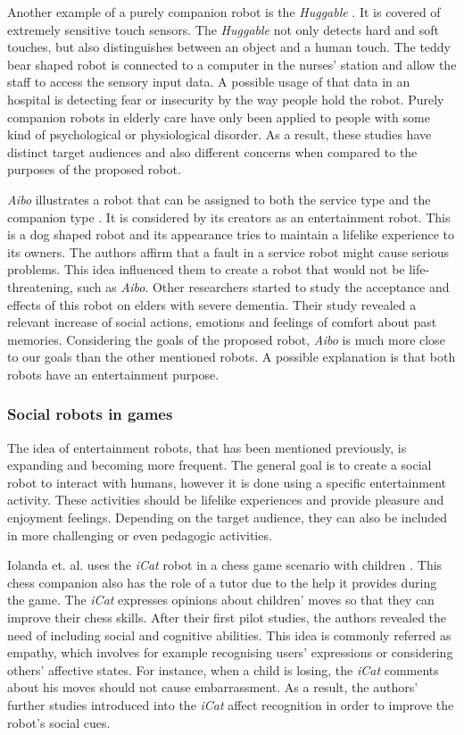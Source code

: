 Another example of a purely companion robot is the \emph{Huggable} \cite{Stiehl2005}.
It is covered of extremely sensitive touch sensors.
The \emph{Huggable} not only detects hard and soft touches, but also distinguishes between an object and a human touch.
The teddy bear shaped robot is connected to a computer in the nurses' station and allow the staff to access the sensory input data.
A possible usage of that data in an hospital is detecting fear or insecurity by the way people hold the robot.
Purely companion robots in elderly care have only been applied to people with some kind of psychological or physiological disorder.
As a result, these studies have distinct target audiences and also different concerns when compared to the purposes of the proposed robot.


\emph{Aibo} illustrates a robot that can be assigned to both the service type and the companion type \cite{Fujita1983}.
It is considered by its creators as an entertainment robot.
This is a dog shaped robot and its appearance tries to maintain a lifelike experience to its owners.
The authors affirm that a fault in a service robot might cause serious problems.
This idea influenced them to create a robot that would not be life-threatening, such as \emph{Aibo}.
Other researchers started to study the acceptance and effects of this robot on elders with severe dementia.
Their study revealed a relevant increase of social actions, emotions and feelings of comfort about past memories.
Considering the goals of the proposed robot, \emph{Aibo} is much more close to our goals than the other mentioned robots.
A possible explanation is that both robots have an entertainment purpose.



\subsubsection{Social robots in games}

The idea of entertainment robots, that has been mentioned previously, is expanding and becoming more frequent.
The general goal is to create a social robot to interact with humans, however it is done using a specific entertainment activity.
These activities should be lifelike experiences and provide pleasure and enjoyment feelings.
Depending on the target audience, they can also be included in more challenging or even pedagogic activities.

Iolanda et. al. uses the \emph{iCat} robot in a chess game scenario with children \cite{Leitea}\cite{Castellano2010}\cite{Leite}.
This chess companion also has the role of a tutor due to the help it provides during the game.
The \emph{iCat} expresses opinions about children' moves so that they can improve their chess skills.
After their first pilot studies, the authors revealed the need of including social and cognitive abilities.
This idea is commonly referred as empathy, which involves for example recognising users' expressions or considering others' affective states.
For instance, when a child is losing, the \emph{iCat} comments about his moves should not cause embarrassment.
As a result, the authors' further studies introduced into the \emph{iCat} affect recognition in order to improve the robot's social cues.

